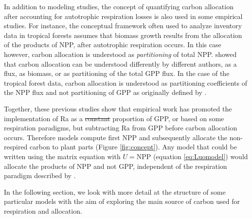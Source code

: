 \documentclass[bg, manuscript]{copernicus}
\providecommand{\DIFdel}[1]{{\protect\color{red}\sout{#1}}}                      %
\providecommand{\DIFdelbegin}{} %
\providecommand{\DIFdelend}{} %
\begin{document}
In addition to modeling studies, the concept of quantifying carbon allocation after accounting for autotrophic respiration losses is also used in some empirical studies. For instance, the conceptual framework often used to analyze inventory data in tropical forests \citep[e.g.][]{Malhi2011, Malhi2015} assumes that biomass growth results from the allocation of the products of NPP, after autotrophic respiration occurs. In this case however, carbon allocation is understood as \emph{partitioning} of total NPP. \citet{Litton2007} showed that carbon allocation can be understood differently by different authors, as a flux, as biomass, or as partitioning of the total GPP flux. In the case of the tropical forest data, carbon allocation is understood as partitioning coefficients of the NPP flux and not partitioning of GPP as originally defined by \citet{Litton2007}.  

Together, these previous studies show that empirical work has promoted the implementation of Ra as a \DIFdelbegin \DIFdel{constant }\DIFdelend proportion of GPP, or based on some respiration paradigms, but subtracting Ra from GPP before carbon allocation occurs. Therefore models compute first NPP and subsequently allocate the non-respired carbon to plant parts (Figure \ref{fig:concept}). Any model that could be written using the matrix equation with $U = \mathrm{NPP}$ (equation \ref{eq:Luomodel}) would allocate the products of NPP and not GPP, independent of the respiration paradigm described by \citet{Amthor2000}. 

In the following section, we look with more detail at the structure of some particular models with the aim of exploring the main source of carbon used for respiration and allocation.
\end{document}
